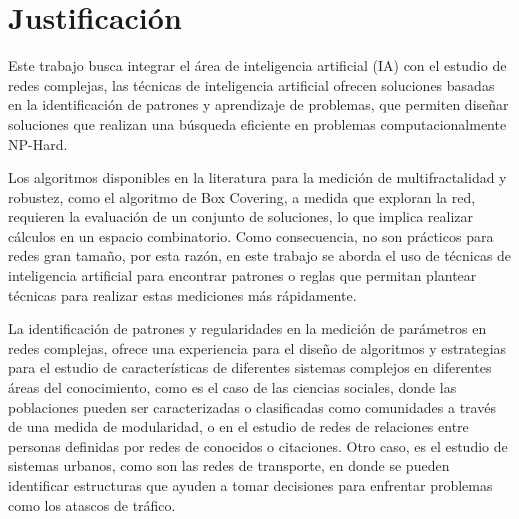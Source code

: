 \section{Justificación}


Este trabajo busca integrar el área de inteligencia artificial (IA) con el estudio de redes complejas, las técnicas de inteligencia artificial ofrecen soluciones basadas en la identificación de patrones y aprendizaje de problemas, que permiten diseñar soluciones que realizan una búsqueda eficiente en problemas computacionalmente NP-Hard.

Los algoritmos disponibles en la literatura para la medición de multifractalidad y robustez,
como el algoritmo de Box Covering, a medida que exploran la red, requieren la evaluación
de un conjunto de soluciones, lo que implica realizar cálculos en un espacio combinatorio.
Como consecuencia, no son prácticos para redes gran tamaño, por esta razón, en este trabajo
se aborda el uso de técnicas de inteligencia artificial para encontrar patrones o reglas que
permitan plantear técnicas para realizar estas mediciones más rápidamente.

La identificación de patrones y regularidades en la medición de parámetros en redes complejas, ofrece una experiencia para el diseño de algoritmos y estrategias para el estudio de
características de diferentes sistemas complejos en diferentes áreas del conocimiento, como es
el caso de las ciencias sociales, donde las poblaciones pueden ser caracterizadas o clasificadas como comunidades a través de una medida de modularidad, o en el estudio de redes de relaciones entre personas definidas por redes de conocidos o citaciones. Otro caso, es el estudio de sistemas urbanos, como son las redes de transporte, en donde se pueden identificar estructuras que ayuden a tomar decisiones para enfrentar problemas como los atascos de tráfico.





